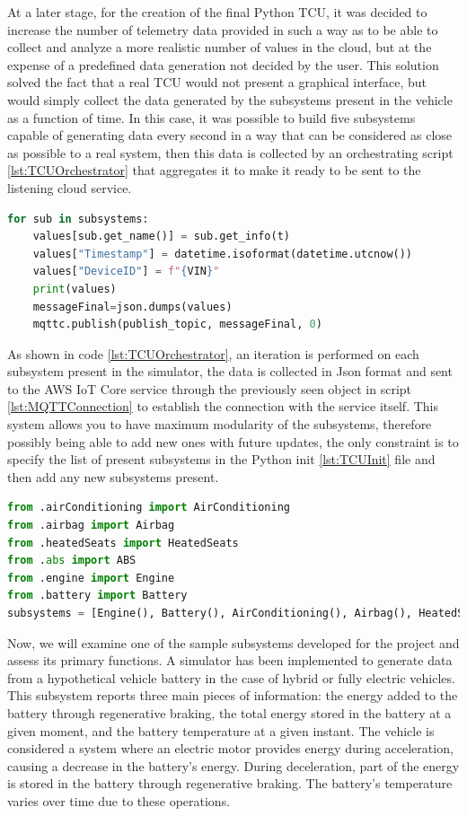 At a later stage, for the creation of the final Python TCU, it was decided to increase the number of telemetry data provided in such a way as to be able to collect and analyze a more realistic number of values in the cloud, but at the expense of a predefined data generation not decided by the user. This solution solved the fact that a real TCU would not present a graphical interface, but would simply collect the data generated by the subsystems present in the vehicle as a function of time. In this case, it was possible to build five subsystems capable of generating data every second in a way that can be considered as close as possible to a real system, then this data is collected by an orchestrating script \ref{lst:TCUOrchestrator} that aggregates it to make it ready to be sent to the listening cloud service.
\begin{lstlisting}[language=Python, caption={TCU orchestrator that collects data from other subsystems}, label=lst:TCUOrchestrator]
for sub in subsystems:
    values[sub.get_name()] = sub.get_info(t)
    values["Timestamp"] = datetime.isoformat(datetime.utcnow())
    values["DeviceID"] = f"{VIN}"
    print(values)
    messageFinal=json.dumps(values)
    mqttc.publish(publish_topic, messageFinal, 0)    
\end{lstlisting}

As shown in code \ref{lst:TCUOrchestrator}, an iteration is performed on each subsystem present in the simulator, the data is collected in Json format and sent to the AWS IoT Core service through the previously seen object in script \ref{lst:MQTTConnection} to establish the connection with the service itself. This system allows you to have maximum modularity of the subsystems, therefore possibly being able to add new ones with future updates, the only constraint is to specify the list of present subsystems in the Python init \ref{lst:TCUInit} file and then add any new subsystems present.
\begin{lstlisting}[language=Python, caption={TCU init file for the import of the TCU subsystems}, label=lst:TCUInit]
from .airConditioning import AirConditioning
from .airbag import Airbag
from .heatedSeats import HeatedSeats
from .abs import ABS
from .engine import Engine
from .battery import Battery
subsystems = [Engine(), Battery(), AirConditioning(), Airbag(), HeatedSeats(), ABS()]  
\end{lstlisting}

Now, we will examine one of the sample subsystems developed for the project and assess its primary functions. A simulator has been implemented to generate data from a hypothetical vehicle battery in the case of hybrid or fully electric vehicles. This subsystem reports three main pieces of information: the energy added to the battery through regenerative braking, the total energy stored in the battery at a given moment, and the battery temperature at a given instant. The vehicle is considered a system where an electric motor provides energy during acceleration, causing a decrease in the battery's energy. During deceleration, part of the energy is stored in the battery through regenerative braking. The battery's temperature varies over time due to these operations.

